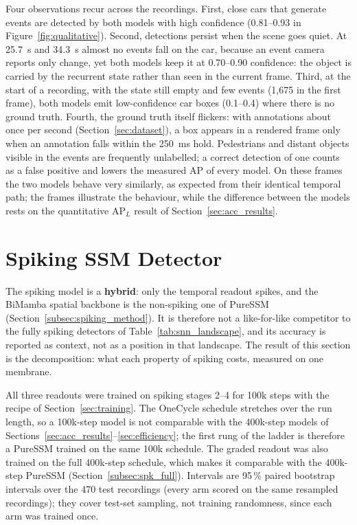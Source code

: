\documentclass[11pt, a4paper]{report}
\begin{document}
Four observations recur across the recordings. First, close cars that generate events are detected
by both models with high confidence (0.81--0.93 in Figure~\ref{fig:qualitative}). Second, detections
persist when the scene goes quiet. At 25.7~s and 34.3~s almost no events fall on the car, because an
event camera reports only change, yet both models keep it at 0.70--0.90 confidence: the object is
carried by the recurrent state rather than seen in the current frame. Third, at the start of a
recording, with the state still empty and few events (1{,}675 in the first frame), both models emit
low-confidence car boxes (0.1--0.4) where there is no ground truth. Fourth, the ground truth itself
flickers: with annotations about once per second (Section~\ref{sec:dataset}), a box appears in a
rendered frame only when an annotation falls within the 250~ms hold. Pedestrians and distant objects
visible in the events are frequently unlabelled; a correct detection of one counts as a false positive
and lowers the measured AP of every model. On these frames the two models behave very similarly,
as expected from their identical temporal path; the frames illustrate the behaviour, while the
difference between the models rests on the quantitative $\mathrm{AP}_L$ result of
Section~\ref{sec:acc_results}.

\section{Spiking SSM Detector}
\label{sec:spiking_results}
The spiking model is a \textbf{hybrid}: only the temporal readout spikes, and the BiMamba spatial backbone
is the non-spiking one of PureSSM (Section~\ref{subsec:spiking_method}). It is therefore not a
like-for-like competitor to the fully spiking detectors of Table~\ref{tab:snn_landscape}, and its accuracy is
reported as context, not as a position in that landscape. The result of this section is the decomposition:
what each property of spiking costs, measured on one membrane.

All three readouts were trained on spiking stages 2--4 for 100k steps with the recipe of
Section~\ref{sec:training}. The OneCycle schedule stretches over the run length, so a 100k-step model is
not comparable with the 400k-step models of Sections~\ref{sec:acc_results}--\ref{sec:efficiency}; the first
rung of the ladder is therefore a PureSSM trained on the same 100k schedule. The graded readout was also
trained on the full 400k-step schedule, which makes it comparable with the 400k-step PureSSM
(Section~\ref{subsec:spk_full}). Intervals are 95\,\% paired
bootstrap intervals over the 470 test recordings (every arm scored on the same resampled recordings); they
cover test-set sampling, not training randomness, since each arm was trained once.
\end{document}
